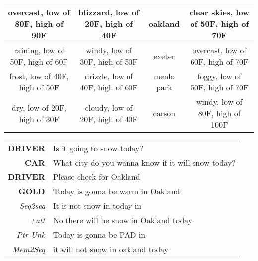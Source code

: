 \documentclass[11pt,a4paper]{article}
\begin{document}
\begin{table}[H]
{\begin{tabular}{|c|c|c|c|}
overcast, low of 80F, high of 90F    & blizzard, low of 20F, high of 40F     & oakland                              & clear skies, low of 50F, high of 70F \\ \hline
raining, low of 50F, high of 60F     & windy, low of 30F, high of 50F        & exeter                               & overcast, low of 60F, high of 70F    \\ \hline
frost, low of 40F, high of 50F       & drizzle, low of 40F, high of 60F      & menlo park                           & foggy, low of 50F, high of 70F       \\ \hline
dry, low of 20F, high of 30F         & cloudy, low of 20F, high of 40F       & carson                               & windy, low of 80F, high of 100F      \\ \hline
\end{tabular}
}

\begin{tabular}{r|l}
\hline
\textbf{DRIVER}      & Is it going to snow today?                         \\
\textbf{CAR}         & What city do you wanna know if it will snow today? \\
\textbf{DRIVER}      & Please check for Oakland                           \\
\textbf{GOLD}        & Today is gonna be warm in Oakland                  \\ \hline
\textit{Seq2seq}     & It is not snow in today in                         \\
\textit{+att}        & No there will be snow in Oakland today             \\
\textit{Ptr-Unk}      & Today is gonna be PAD in                           \\ \hline
\textit{Mem2Seq} & it will not snow in oakland today                  \\ \hline
\end{tabular}
\end{table}
\end{document}

